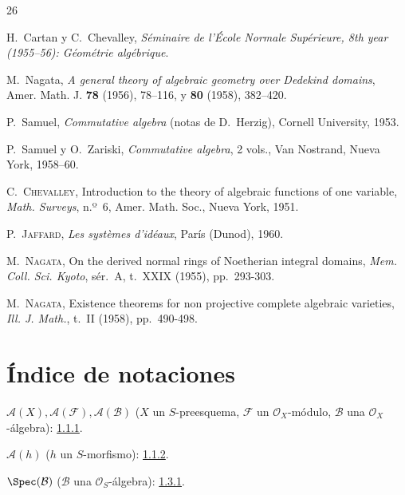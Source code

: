 \documentclass[oneside,10pt]{amsart}
\newcommand{\oldpage}[2][]{\marginnote{\normalfont\footnotesize\textbf{#1}~|~#2}\ignorespaces}
\begin{document}
\begin{thebibliography}{26}

H.~Cartan y C.~Chevalley,
\emph{Séminaire de l'École Normale Supérieure, 8th year (1955--56):
Géométrie algébrique}.

M.~Nagata,
\emph{A general theory of algebraic geometry over Dedekind domains},
Amer. Math. J. \textbf{78} (1956), 78--116, y \textbf{80} (1958),
382--420.

P.~Samuel,
\emph{Commutative algebra} (notas de D.~Herzig), Cornell University,
1953.

P.~Samuel y O.~Zariski,
\emph{Commutative algebra}, 2 vols., Van Nostrand, Nueva York, 1958--60.


C.~\textsc{Chevalley},
Introduction to the theory of algebraic functions of one variable,
\emph{Math. Surveys}, n.º~6, Amer. Math. Soc., Nueva York, 1951.

P.~\textsc{Jaffard},
\emph{Les systèmes d'idéaux}, París (Dunod), 1960.

M.~\textsc{Nagata},
On the derived normal rings of Noetherian integral domains,
\emph{Mem. Coll. Sci. Kyoto}, sér.~A, t.~XXIX (1955), pp.~293-303.

M.~\textsc{Nagata},
Existence theorems for non projective complete algebraic varieties,
\emph{Ill. J. Math.}, t.~II (1958), pp.~490-498.

\end{thebibliography}
\clearpage

\clearpage
\oldpage[II]{207}
{}
\section*{Índice de notaciones}

\begingroup
\small
\setlength{\parindent}{0pt}
\setlength{\parskip}{2pt}

$\mathcal{A}(X),\mathcal{A}(\mathcal{F}),\mathcal{A}(\mathcal{B})$
($X$ un $S$-preesquema, $\mathcal{F}$ un $\mathcal{O}_X$-módulo,
$\mathcal{B}$ una $\mathcal{O}_X$-álgebra): \hyperref[II.1.1.1-fr]{1.1.1}.

$\mathcal{A}(h)$ ($h$ un $S$-morfismo): \hyperref[II.1.1.2-fr]{1.1.2}.

$\Spec(\mathcal{B})$ ($\mathcal{B}$ una $\mathcal{O}_S$-álgebra): \hyperref[II.1.3.1-fr]{1.3.1}.
\end{document}
